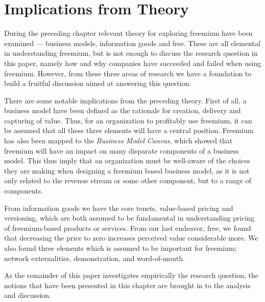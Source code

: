 \section{Implications from Theory}
\label{section:implications}

During the preceding chapter relevant theory for exploring freemium have been examined --- business models, information goods and free. These are all elemental in understanding freemium, but is not enough to discuss the research question in this paper, namely how and why companies have succeeded and failed when using freemium. However, from these three areas of research we have a foundation to build a fruitful discussion aimed at answering this question.

There are some notable implications from the preceding theory. First of all, a business model have been defined as the rationale for creation, delivery and capturing of value. Thus, for an organization to profitably use freemium, it can be assumed that all these three elements will have a central position. Freemium has also been mapped to the \emph{Business Model Canvas,} which showed that freemium will have an impact on many disparate components of a business model. This thus imply that an organization must be well-aware of the choices they are making when designing a freemium based business model, as it is not only related to the revenue stream or some other component, but to a range of components.

From information goods we have the core tenets, value-based pricing and versioning, which are both assumed to be fundamental in understanding pricing of freemium-based products or services. From our last endeavor, free, we found that decreasing the price to zero increases perceived value considerable more. We also found three elements which is assumed to be important for freemium; network externalities, demonstration, and word-of-mouth.

As the remainder of this paper investigates empirically the research question, the notions that have been presented in this chapter are brought in to the analysis and discussion.